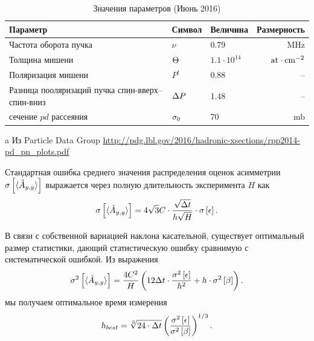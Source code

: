 \documentclass{article}
\begin{document}
	\begin{table}[h]
		\centering
		\caption{Значения параметров (Июнь 2016)\label{tbl:Param}}
		\begin{threeparttable}[h]
			\begin{tabular}{p{4.5cm}llr}
				\hline\hline
				Параметр                                         & Символ            & Величина           &             Размерность \\ \hline
				Частота оборота пучка                            & $\nu$             & 0.79               &                     MHz \\
				Толщина мишени                                   & $\Thick$          & $1.1\cdot 10^{14}$ & $\mathrm{at\cdot cm^{-2}}$ \\
				Поляризация мишени                               & $P^t$             & 0.88               &                      -- \\
				Разница пооляризаций пучка спин-вверх--спин-вниз & $\Delta P$             & 1.48               &                      -- \\
				сечение $pd$ рассеяния                           & $\CS[0]$\tnote{a} & 70                 &                      mb \\ \hline
			\end{tabular}
			\begin{tablenotes}
				\item[a]{Из Particle Data Group \url{http://pdg.lbl.gov/2016/hadronic-xsections/rpp2014-pd_pn_plots.pdf}}
			\end{tablenotes}
		\end{threeparttable}
	\end{table}
	
	Стандартная ошибка среднего значения распределения оценок асимметрии $\SE{\avg{\Ayy*}}$ выражается через полную длительность эксперимента $H$ как
	\begin{equation}\label{eq:AvgAyySEPhys}
	\SE{\avg{\Ayy*}} = 4\sqrt{3}C\cdot \frac{\sqrt{\Tint}}{h\sqrt{H}}\cdot\SE{\err}.
	\end{equation}
	
	В связи с собственной вариацией наклона касательной, существует оптимальный размер статистики, дающий статистическую ошибку сравнимую с систематической ошибкой. Из выражения
	\begin{equation}
		\v{\avg{\Ayy*}}	= \frac{4 C^2}{H}\bkt{12\Tint\cdot\frac{\v{\err}}{h^2} + h\cdot\v{\slp}}.
	\end{equation}
	мы получаем оптимальное время измерения
	\begin{equation}
	h_{best} = \sqrt[3]{24\cdot \Tint} \bkt{\frac{\v{\err}}{\v{\slp}}}^{1/3}.
	\end{equation}
	
\end{document}
